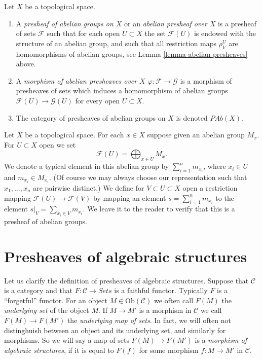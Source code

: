 \begin{definition}
\label{definition-abelian-presheaves}
Let $X$ be a topological space.
\begin{enumerate}
\item A {\it presheaf of abelian groups on $X$} or an
{\it abelian presheaf over $X$}
is a presheaf of sets $\mathcal{F}$ such that for each open
$U \subset X$ the set $\mathcal{F}(U)$ is endowed with
the structure of an abelian group, and such that all restriction
maps $\rho^U_V$ are homomorphisms of abelian groups, see
Lemma \ref{lemma-abelian-presheaves} above.
\item A {\it morphism of abelian presheaves over $X$}
$\varphi : \mathcal{F} \to \mathcal{G}$ is a morphism of presheaves
of sets which induces
a homomorphism of abelian groups $\mathcal{F}(U) \to \mathcal{G}(U)$
for every open $U \subset X$.
\item The category of presheaves of abelian groups on $X$ is denoted
$\textit{PAb}(X)$.
\end{enumerate}
\end{definition}

\begin{example}
\label{example-direct-sum-points}
Let $X$ be a topological space. For each $x \in X$ suppose
given an abelian group $M_x$. For $U \subset X$ open
we set
$$
\mathcal{F}(U) = \bigoplus\nolimits_{x \in U} M_x.
$$
We denote a typical element in this abelian group by
$\sum_{i = 1}^n m_{x_i}$, where $x_i \in U$ and $m_{x_i} \in M_{x_i}$.
(Of course we may always choose our representation such that
$x_1, \ldots, x_n$ are pairwise distinct.)
We define for $V \subset U \subset X$ open a restriction
mapping $\mathcal{F}(U) \to \mathcal{F}(V)$ by
mapping an element $s = \sum_{i = 1}^n m_{x_i}$
to the element $s|_V = \sum_{x_i \in V} m_{x_i}$.
We leave it to the reader to verify that this is a
presheaf of abelian groups.
\end{example}



\section{Presheaves of algebraic structures}
\label{section-presheaves-structures}

\noindent
Let us clarify the definition
of presheaves of algebraic structures.
Suppose that $\mathcal{C}$ is a category and
that $F : \mathcal{C} \to \textit{Sets}$ is
a faithful functor. Typically $F$ is a ``forgetful''
functor. For an object $M \in \text{Ob}(\mathcal{C})$
we often call $F(M)$ the {\it underlying set} of the
object $M$. If $M \to M'$ is a morphism in $\mathcal{C}$
we call $F(M) \to F(M')$ the {\it underlying map of sets}.
In fact, we will often not distinghuish between an object
and its underlying set, and similarly for morphisms.
So we will say a map of sets $F(M) \to F(M')$
is a {\it morphism of algebraic structures}, if it is
equal to $F(f)$ for some morphism $f : M \to M'$
in $\mathcal{C}$.

